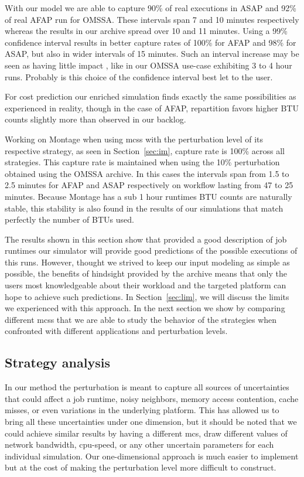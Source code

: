 \documentclass[10pt,conference,compsocconf]{IEEEtran}
\begin{document}
With our model we  are able to capture 90\% of real executions  in ASAP and 92\%
of real AFAP run for OMSSA\@. These intervals span 7 and 10 minutes respectively
whereas the results in our archive spread  over 10 and 11 minutes.  Using a 99\%
confidence interval results  in better capture rates of 100\%  for AFAP and 98\%
for ASAP, but also in wider intervals  of 15 minutes.  Such an interval increase
may be seen as having little impact , like in our OMSSA use-case exhibiting 3 to
4 hour runs. Probably is this choice  of the confidence interval best let to the
user.

For cost prediction our enriched  simulation finds exactly the same possibilities
as experienced in reality, though in  the case of AFAP, repartition favors higher
BTU counts slightly more than observed in our backlog.

Working on Montage when using \acp{mcs} with the perturbation level of its
respective strategy, as seen in Section~\ref{sec:im}, capture rate is 100\%
across all strategies. This capture rate is maintained when using the 10\%
perturbation obtained using the OMSSA archive. In this cases the intervals span
from 1.5 to 2.5 minutes for AFAP and ASAP respectively on workflow lasting from
47 to 25 minutes. Because Montage has a sub 1 hour runtimes BTU counts are
naturally stable, this stability is also found in the results of our simulations
that match perfectly the number of BTUs used.

The results shown in  this section show that provided a  good description of job
runtimes our simulator will provide  good predictions of the possible executions
of this runs. However,  thought we strived to keep our  input modeling as simple
as possible, the  benefits of hindsight provided by the  archive means that only
the users most knowledgeable about their  workload and the targeted platform can
hope to achieve such predictions.  In Section~\ref{sec:lim}, we will discuss the
limits we experienced with this approach. In the next section we show by comparing
different \acp{mcs}  that we are able  to study the behavior  of the strategies
when confronted with different applications and perturbation levels.


\subsection{Strategy analysis}\label{sec:sa}

In our method the perturbation is meant to capture all sources of uncertainties
that could affect a job runtime, noisy neighbors, memory access contention,
cache misses, or even variations in the underlying platform. This has allowed us
to bring all these uncertainties under one dimension, but it should be noted that
we could achieve similar results by having a different \ac{mcs}, draw different values
of network bandwidth, cpu-speed, or any other uncertain parameters for each
individual simulation. Our one-dimensional approach is much easier to implement
but at the cost of making the perturbation level more difficult to construct.
\end{document}
